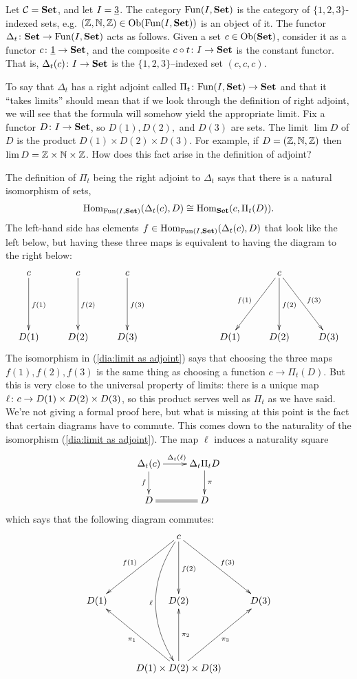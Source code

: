 \documentclass[CT4S-EN-RU]{subfiles}
\begin{document}
\begin{exampleENG}
Let $\mathcal{C}={\mathbf{Set}}$, and let $I=\underline{3}$. The category $\textnormal{Fun}(I,{\mathbf{Set}})$ is the category of $\{1,2,3\}$-indexed sets, e.g. $({\mathbb Z},{\mathbb N},{\mathbb Z})\in\textnormal{Ob}(\textnormal{Fun}(I,{\mathbf{Set}}))$ is an object of it. The functor $\Delta_t\colon{\mathbf{Set}}\rightarrow\textnormal{Fun}(I,{\mathbf{Set}})$ acts as follows. Given a set $c\in\textnormal{Ob}({\mathbf{Set}})$, consider it as a functor $c\colon\underline{1}\rightarrow{\mathbf{Set}}$, and the composite $c\circ t\colon I\rightarrow{\mathbf{Set}}$ is the constant functor. That is, $\Delta_t(c)\colon I\rightarrow{\mathbf{Set}}$ is the $\{1,2,3\}$--indexed set $(c,c,c)$.

To say that $\Delta_t$ has a right adjoint called $\Pi_t\colon\textnormal{Fun}(I,{\mathbf{Set}})\rightarrow{\mathbf{Set}}$ and that it “takes limits” should mean that if we look through the definition of right adjoint, we will see that the formula will somehow yield the appropriate limit. Fix a functor $D\colon I\rightarrow{\mathbf{Set}}$, so $D(1),D(2),$ and $D(3)$ are sets. The limit $\lim D$ of $D$ is the product $D(1)\times D(2)\times D(3)$. For example, if $D=({\mathbb Z},{\mathbb N},{\mathbb Z})$ then $\lim D={\mathbb Z}\times{\mathbb N}\times{\mathbb Z}$. How does this fact arise in the definition of adjoint?

The definition of $\Pi_t$ being the right adjoint to $\Delta_t$ says that there is a natural isomorphism of sets, 
\begin{align}\label{dia:limit as adjoint}
\textnormal{Hom}_{\textnormal{Fun}(I,{\mathbf{Set}})}(\Delta_t(c),D)\cong\textnormal{Hom}_{\mathbf{Set}}(c,\Pi_t(D)).
\end{align}
The left-hand side has elements $f\in\textnormal{Hom}_{\textnormal{Fun}(I,{\mathbf{Set}})}(\Delta_t(c),D)$ that look like the left below, but having these three maps is equivalent to having the diagram to the right below:
$$\xymatrix{
c\ar[dd]^{f(1)}&c\ar[dd]^{f(2)}&c\ar[dd]^{f(3)}\\\\
D(1)&D(2)&D(3)
}
\hspace{1in}
\xymatrix{
&c\ar[ddl]_{f(1)}\ar[dd]^{f(2)}\ar[ddr]^{f(3)}\\\\
D(1)&D(2)&D(3)
}$$
The isomorphism in (\ref{dia:limit as adjoint}) says that choosing the three maps $f(1),f(2),f(3)$ is the same thing as choosing a function $c\to\Pi_t(D)$. But this is very close to the universal property of limits: there is a unique map $\ell\colon c\rightarrow D(1)\times D(2)\times D(3)$, so this product serves well as $\Pi_t$ as we have said. We're not giving a formal proof here, but what is missing at this point is the fact that certain diagrams have to commute. This comes down to the naturality of the isomorphism (\ref{dia:limit as adjoint}). The map $\ell$ induces a naturality square
$$\xymatrix{\Delta_t(c)\ar[r]^{\Delta_t(\ell)}\ar[d]_f&\Delta_t\Pi_tD\ar[d]^\pi\\D\ar@{=}[r]&D}$$
which says that the following diagram commutes:
$$\xymatrix{&c\ar[ddl]_{f(1)}\ar[dd]^{f(2)}\ar[ddr]^{f(3)}\ar@/_2pc/[dddd]_\ell\\\\
D(1)&D(2)&D(3)\\\\
&D(1)\times D(2)\times D(3)\ar[uul]^{\pi_1}\ar[uu]_{\pi_2}\ar[uur]_{\pi_3}
}$$
\end{exampleENG}
\end{document}
